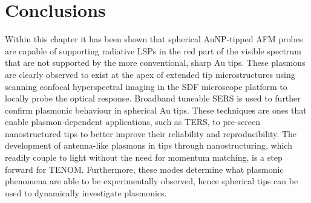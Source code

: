 \documentclass[12pt, a4paper, oneside]{book}
\begin{document}
\section{Conclusions}


Within this chapter it has been shown that spherical AuNP-tipped AFM probes are capable of supporting radiative LSPs in the red part of the visible spectrum that are not supported by the more conventional, sharp Au tips. These plasmons are clearly observed to exist at the apex of extended tip microstructures using scanning confocal hyperspectral imaging in the SDF microscope platform to locally probe the optical response. Broadband tuneable SERS is used to further confirm plasmonic behaviour in spherical Au tips. These techniques are ones that enable plasmon-dependent applications, such as TERS, to pre-screen nanostructured tips to better improve their reliability and reproducibility. The development of antenna-like plasmons in tips through nanostructuring, which readily couple to light without the need for momentum matching, is a step forward for TENOM. Furthermore, these modes determine what plasmonic phenomena are able to be experimentally observed, hence spherical tips can be used to dynamically investigate plasmonics.

\ifstandalone
\begin{singlespace}
\fontsize{8pt}{1em}\selectfont
\printbibliography[notcategory=fullcited]
\end{singlespace}
\fi
\end{document}
